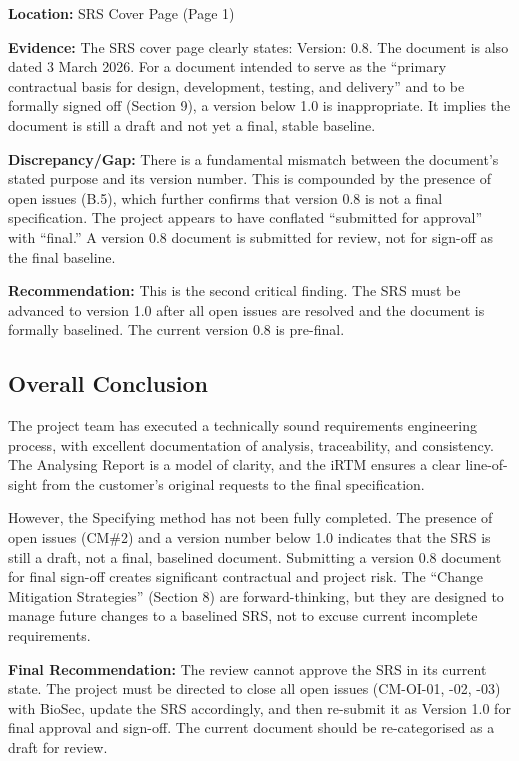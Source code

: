 \documentclass[11pt,a4paper]{article}
\begin{document}
\textbf{Location:} SRS Cover Page (Page 1)

\textbf{Evidence:} The SRS cover page clearly states: Version: 0.8. The document is also dated 3 March 2026. For a document intended to serve as the ``primary contractual basis for design, development, testing, and delivery'' and to be formally signed off (Section 9), a version below 1.0 is inappropriate. It implies the document is still a draft and not yet a final, stable baseline.

\textbf{Discrepancy/Gap:} There is a fundamental mismatch between the document's stated purpose and its version number. This is compounded by the presence of open issues (B.5), which further confirms that version 0.8 is not a final specification. The project appears to have conflated ``submitted for approval'' with ``final.'' A version 0.8 document is submitted for review, not for sign-off as the final baseline.

\textbf{Recommendation:} This is the second critical finding. The SRS must be advanced to version 1.0 after all open issues are resolved and the document is formally baselined. The current version 0.8 is pre-final.

\subsection*{Overall Conclusion}

The project team has executed a technically sound requirements engineering process, with excellent documentation of analysis, traceability, and consistency. The Analysing Report is a model of clarity, and the iRTM ensures a clear line-of-sight from the customer's original requests to the final specification.

However, the Specifying method has not been fully completed. The presence of open issues (CM\#2) and a version number below 1.0 indicates that the SRS is still a draft, not a final, baselined document. Submitting a version 0.8 document for final sign-off creates significant contractual and project risk. The ``Change Mitigation Strategies'' (Section 8) are forward-thinking, but they are designed to manage future changes to a baselined SRS, not to excuse current incomplete requirements.

\textbf{Final Recommendation:} The review cannot approve the SRS in its current state. The project must be directed to close all open issues (CM-OI-01, -02, -03) with BioSec, update the SRS accordingly, and then re-submit it as Version 1.0 for final approval and sign-off. The current document should be re-categorised as a draft for review.
\end{document}
